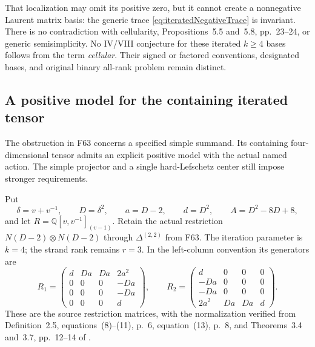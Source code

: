 \documentclass[11pt,a4paper]{article}
\newcommand{\Q}{\mathbb Q}\newcommand{\Z}{\mathbb Z}\newcommand{\C}{\mathbb C}\newcommand{\N}{\mathbb N}\newcommand{\F}{\mathbb F}
\newcommand{\fid}[1]{\textsf{#1}}\newcommand{\gate}[1]{\textsf{#1}}
\theoremstyle{named}\newtheorem{finding}{Finding}[section]
\theoremstyle{definition}\newtheorem{definition}[finding]{Definition}
\theoremstyle{remark}\newtheorem{remark}[finding]{Remark}
\begin{document}
That localization may omit its positive zero, but it
cannot create a nonnegative Laurent matrix basis:
the generic trace \eqref{eq:iteratedNegativeTrace}
is invariant. There is no contradiction with cellularity,
Propositions~5.5 and~5.8, pp.~23--24, or generic
semisimplicity. No IV/VIII conjecture for these
iterated \(k\ge4\) bases follows from the term
\emph{cellular}. Their signed or factored conventions,
designated bases, and original binary all-rank problem
remain distinct.

\subsection{A positive model for the containing iterated tensor}

The obstruction in \fid{F63} concerns a specified simple
summand. Its containing four-dimensional tensor admits
an explicit positive model with the actual named action.
The simple projector and a single hard-Lefschetz center
still impose stronger requirements.

Put
\[
 \delta=v+v^{-1},\qquad D=\delta^2,\qquad
 a=D-2,\qquad d=D^2,\qquad A=D^2-8D+8,
\]
and let \(R=\Q[v,v^{-1}]_{(v-1)}\).
Retain the actual restriction
\(N(D-2)\otimes N(D-2)\) through
\(\Delta^{(2,2)}\) from \fid{F63}.
The iteration parameter is \(k=4\); the strand rank
remains \(r=3\).
In the left-column convention its generators are
\begin{equation}\label{eq:positiveIteratedActualMatrices}
 R_1=\begin{pmatrix}
 d&Da&Da&2a^2\\0&0&0&-Da\\0&0&0&-Da\\0&0&0&d
 \end{pmatrix},\qquad
 R_2=\begin{pmatrix}
 d&0&0&0\\-Da&0&0&0\\-Da&0&0&0\\2a^2&Da&Da&d
 \end{pmatrix}.
\end{equation}
These are the source restriction matrices, with the
normalization verified from Definition~2.5,
equations~(8)--(11), p.~6, equation~(13), p.~8,
and Theorems~3.4 and~3.7, pp.~12--14
of \cite{BlasiakChebyshev}.
\end{document}
